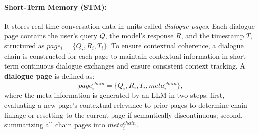 \documentclass[11pt]{article}
\begin{document}


\paragraph{Short-Term Memory (STM):} 
It stores real-time conversation data in units called \emph{dialogue pages}. Each dialogue page contains the user's query $Q$, the model's response $R$, and the timestamp $T$, structured as $page_i = \{Q_i, R_i, T_i\}$.
To ensure contextual coherence, a dialogue chain is constructed for each page to maintain contextual information in short-term continuous dialogue exchanges and ensure consistent context tracking. A \textbf{dialogue page} is defined as: 
\begin{equation}
page^{chain}_i= \{Q_i, R_i, T_i, meta^{chain}_i\},
\end{equation}
where the meta information 
is generated by an LLM in two steps: first, evaluating a new page’s contextual relevance to prior pages to determine chain linkage or resetting to the current page if semantically discontinuous; second, summarizing all chain pages into $meta^{chain}_i$.






\end{document}
